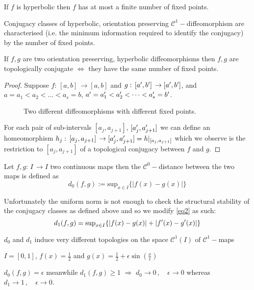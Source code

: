 \documentclass[../main.tex]{subfiles}
\begin{document}
\begin{corollary}
     If $f$ is hyperbolic then $f$ has at most a finite number of fixed points.
\end{corollary}
\begin{corollary}
     Conjugacy classes of hyperbolic, orientation preserving $\mathcal{C}^{1}-$diffeomorphism are characterised (i.e. the minimum information required to identify the conjugacy) by the number of fixed points. 
\end{corollary}
\begin{proposition*}
     If $f,g$ are two orientation preserving, hyperbolic diffeomorphisms then $f,g$ are topologically conjugate $\iff$ they have the same number of fixed points.
\end{proposition*}
\begin{proof}
     Suppose $f:\,[a,b]\,\to [a,b]$ and $g:\,[a',b']\,\to [a',b']$, and $a=a_{1}<a_{2}<\dots<a_{s}=b$, $a'=a'_{1}<a'_{2}<\dots<a'_{s}=b'$.     
     \begin{figure}[H]
         \centering 
         \caption{Two different diffeomorphisms with different fixed points.}
         \label{fig1}
     \end{figure}
     For each pair of sub-intervals $[a_{j}, a_{j+1}]$, $[a'_{j},a'_{j+1}]$ we can define an homeomorphism $h_{j}:\,[a_{j},a_{j+1}]\,\to [a'_{j},a'_{j+1}]=h|_{[a_{j},a_{j+1}]}$ which we observe is the restriction to $[a_{j},a_{j+1}]$ of a topological conjugacy between $f$ and $g$.
\end{proof}
\begin{definition}\label{def2}
     Let $f,g:\,I\,\to I$ two continuous maps then the $\mathcal{C}^{0}-$distance between the two maps is defined as
     \begin{equation}\label{eq2}
             d_{0}(f,g):=\text{sup}_{x\in I}\{|f(x)-g(x)|\}_{}
     \end{equation}
\end{definition}
Unfortunately the uniform norm is not enough to check the structural stability of the conjugacy classes as defined above and so we modify \eqref{eq2} as such:
\begin{equation}\label{eq3}
     d_{1}(f,g)=\text{sup}_{x\in I}\{|f(x)-g(x)|+|f'(x) - g'(x)|\}_{}
\end{equation}
\begin{remark*}
        $d_{0}$ and $d_{1}$ induce very different topologies on the space $\mathcal{C}^{1}(I)$ of $\mathcal{C}^{1}-$maps
\end{remark*}
\begin{example}[label=ex1]{}{}
        $I=[0,1]$, $f(x)=\frac{1}{2}$ and $g(x)=\frac{1}{2}+ \epsilon \sin(\frac{x}{\epsilon})$

        $d_{0}(f,g)=\epsilon$ meanwhile $d_{1}(f,g)\geq1$ $\Rightarrow$ $d_{0}\to 0\,,\quad\epsilon\to0$ whereas $d_{1}\to1\,,\quad\epsilon\to0$.
\end{example}
\end{document}
